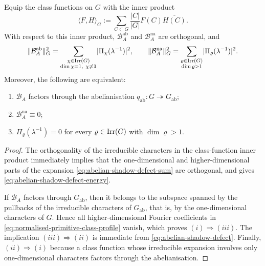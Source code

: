 \begin{theorem}
  \label{thm:abelian-shadow-defect}
  Equip the class functions on \(G\) with the inner product
  \[
    \langle F,H\rangle_G
    :=
    \sum_{C\subset G}\frac{|C|}{|G|}F(C)\overline{H(C)}.
  \]
  With respect to this inner product,
  \(\mathcal B_A^{\mathrm{ab}}\) and \(\mathcal B_A^{\mathrm{na}}\)
  are orthogonal, and
  \begin{equation}\label{eq:abelian-shadow-defect-energy}
    \lVert \mathcal B_A^{\mathrm{ab}} \rVert_G^2
    =
    \sum_{\substack{\chi\in\operatorname{Irr}(G)\\ \dim\chi=1,\ \chi\neq \mathbf 1}}
      \lvert \Pi_\chi(\lambda^{-1}) \rvert^2,
    \qquad
    \lVert \mathcal B_A^{\mathrm{na}} \rVert_G^2
    =
    \sum_{\substack{\varrho\in\operatorname{Irr}(G)\\ \dim\varrho>1}}
      \lvert \Pi_\varrho(\lambda^{-1}) \rvert^2.
  \end{equation}
  Moreover, the following are equivalent:
  \begin{enumerate}[label=\textup{(\roman*)}]
    \item \(\mathcal B_A\) factors through the abelianisation
      \(q_{\mathrm{ab}}:G\twoheadrightarrow G_{\mathrm{ab}}\);
    \item \(\mathcal B_A^{\mathrm{na}}\equiv 0\);
    \item \(\Pi_\varrho(\lambda^{-1})=0\) for every
      \(\varrho\in\operatorname{Irr}(G)\) with \(\dim\varrho>1\).
  \end{enumerate}
\end{theorem}

\begin{proof}
  The orthogonality of the irreducible characters in the class-function
  inner product immediately implies that the one-dimensional and
  higher-dimensional parts of the expansion
  \eqref{eq:abelian-shadow-defect-sum} are orthogonal, and gives
  \eqref{eq:abelian-shadow-defect-energy}.

  If \(\mathcal B_A\) factors through \(G_{\mathrm{ab}}\), then it
  belongs to the subspace spanned by the pullbacks of the irreducible
  characters of \(G_{\mathrm{ab}}\), that is, by the one-dimensional
  characters of \(G\). Hence all higher-dimensional Fourier coefficients
  in \eqref{eq:normalised-primitive-class-profile} vanish, which proves
  \((i)\Rightarrow(iii)\). The implication \((iii)\Rightarrow(ii)\) is
  immediate from \eqref{eq:abelian-shadow-defect}. Finally,
  \((ii)\Rightarrow(i)\) because a class function whose irreducible
  expansion involves only one-dimensional characters factors through the
  abelianisation.
\end{proof}


